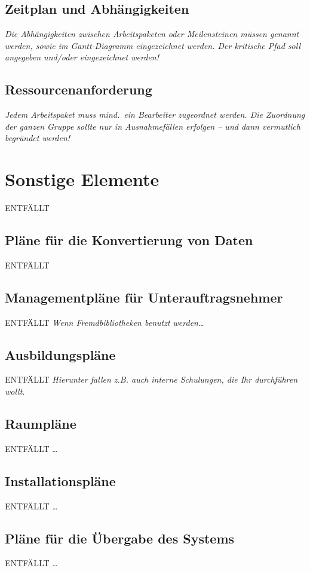 \documentclass[fontsize=12pt,paper=a4,twoside]{scrartcl}
\begin{document}
\subsection{Zeitplan und Abhängigkeiten}

{\em Die Abhängigkeiten zwischen Arbeitspaketen oder Meilensteinen müssen genannt werden, sowie im
  Gantt-Diagramm eingezeichnet werden. Der kritische Pfad soll
  angegeben und/oder eingezeichnet werden!}

\subsection{Ressourcenanforderung}

{\em Jedem Arbeitspaket muss mind.\ ein Bearbeiter zugeordnet
  werden. Die Zuordnung der ganzen Gruppe sollte nur in Ausnahmefällen
  erfolgen -- und dann vermutlich begründet werden!}


\section{Sonstige Elemente}
ENTFÄLLT
\subsection{Pläne für die Konvertierung von Daten}
ENTFÄLLT

\subsection{Managementpläne für Unterauftragsnehmer}
ENTFÄLLT
{\em Wenn Fremdbibliotheken benutzt werden\dots}

\subsection{Ausbildungspläne}
ENTFÄLLT
{\em Hierunter fallen z.B. auch interne Schulungen, die Ihr
  durchführen wollt.}

\subsection{Raumpläne}
ENTFÄLLT
\dots

\subsection{Installationspläne}
ENTFÄLLT
\dots

\subsection{Pläne für die Übergabe des Systems}
ENTFÄLLT
\dots
\end{document}
